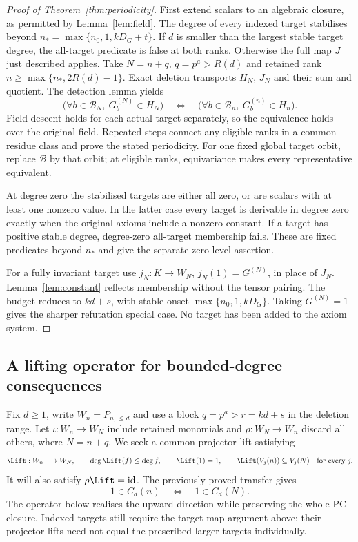 \begin{proof}[Proof of Theorem~\ref{thm:periodicity}]
First extend scalars to an algebraic closure, as permitted by
Lemma~\ref{lem:field}. The degree of every indexed target stabilises
beyond $n_*=\max\{n_0,1,kD_G+t\}$. If $d$ is smaller than the
largest stable target degree, the all-target predicate is false at both
ranks. Otherwise the full map $J$ just described applies.
Take $N=n+q$, $q=p^a>R(d)$ and retained rank
$n\ge\max\{n_*,2R(d)-1\}$. Exact deletion transports $H_N$, $J_N$
and their sum and quotient. The detection lemma yields
\[
 \bigl(\forall b\in\mathcal B_N,\ G_b^{(N)}\in H_N\bigr)
 \quad\Longleftrightarrow\quad
 \bigl(\forall b\in\mathcal B_n,\ G_b^{(n)}\in H_n\bigr).
\]
Field descent holds for each actual target separately, so the equivalence
holds over the original field. Repeated steps connect any eligible
ranks in a common residue class and prove the stated periodicity.
For one fixed global target orbit, replace $\mathcal B$ by that orbit;
at eligible ranks, equivariance makes every representative equivalent.

At degree zero the stabilised targets are either all zero, or are
scalars with at least one nonzero value. In the latter case every target
is derivable in degree zero exactly when the original axioms include a
nonzero constant. If a target has positive stable degree, degree-zero
all-target membership fails. These are fixed predicates beyond $n_*$
and give the separate zero-level assertion.

For a fully invariant target use $j_N:K\to W_N$, $j_N(1)=G^{(N)}$,
in place of $J_N$. Lemma~\ref{lem:constant} reflects membership without
the tensor pairing. The budget reduces to $kd+s$, with stable onset
$\max\{n_0,1,kD_G\}$. Taking $G^{(N)}=1$ gives the sharper refutation
special case. No target has been added to the axiom system.
\end{proof}

\subsection{A lifting operator for bounded-degree consequences}
Fix $d\ge1$, write $W_n=P_{n,\le d}$ and use a block
$q=p^a>r=kd+s$ in the deletion range. Let
$\iota:W_n\to W_N$ include retained monomials and
$\rho:W_N\to W_n$ discard all others, where $N=n+q$.
We seek a common projector lift satisfying
\begin{equation}\label{eq:newcontract}
 \Lift:W_n\longrightarrow W_N,\qquad
 \deg\Lift(f)\le\deg f,\qquad\Lift(1)=1,\qquad
 \Lift(V_j(n))\subseteq V_j(N)\quad\text{for every }j.
\end{equation}
It will also satisfy $\rho\Lift=\mathrm{id}$. The previously proved
transfer gives
\begin{equation}\label{eq:newiff}
 1\in C_d(n)\quad\Longleftrightarrow\quad1\in C_d(N).
\end{equation}
The operator below realises the upward direction while preserving the
whole PC closure. Indexed targets still require the target-map
argument above; their projector lifts need not equal the prescribed
larger targets individually.

